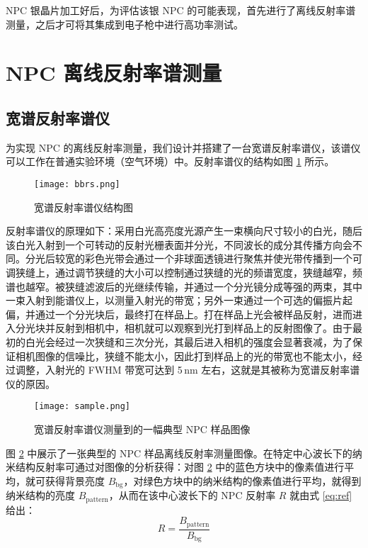 NPC 银晶片加工好后，为评估该银 NPC 的可能表现，首先进行了离线反射率谱测量，之后才可将其集成到电子枪中进行高功率测试。

\section{NPC 离线反射率谱测量}
\subsection{宽谱反射率谱仪}
为实现 NPC 的离线反射率测量，我们设计并搭建了一台宽谱反射率谱仪，该谱仪可以工作在普通实验环境（空气环境）中。反射率谱仪的结构如图 \ref{fig:bbrs} 所示。
\begin{figure}[htbp]
\centering
\texttt{[image: bbrs.png]}
\caption{\label{fig:bbrs} 宽谱反射率谱仪结构图}
\end{figure}

反射率谱仪的原理如下：采用白光高亮度光源产生一束横向尺寸较小的白光，随后该白光入射到一个可转动的反射光栅表面并分光，不同波长的成分其传播方向会不同。分光后较宽的彩色光带会通过一个非球面透镜进行聚焦并使光带传播到一个可调狭缝上，通过调节狭缝的大小可以控制通过狭缝的光的频谱宽度，狭缝越窄，频谱也越窄。被狭缝滤波后的光继续传输，并通过一个分光镜分成等强的两束，其中一束入射到能谱仪上，以测量入射光的带宽；另外一束通过一个可选的偏振片起偏，并通过一个分光块后，最终打在样品上。打在样品上光会被样品反射，进而进入分光块并反射到相机中，相机就可以观察到光打到样品上的反射图像了。由于最初的白光会经过一次狭缝和三次分光，其最后进入相机的强度会显著衰减，为了保证相机图像的信噪比，狭缝不能太小，因此打到样品上的光的带宽也不能太小，经过调整，入射光的 FWHM 带宽可达到 5\,nm 左右，这就是其被称为宽谱反射率谱仪的原因。

\begin{figure}[htbp]
\centering
\texttt{[image: sample.png]}
\caption{\label{fig:sample} 宽谱反射率谱仪测量到的一幅典型 NPC 样品图像}
\end{figure}

图 \ref{fig:sample} 中展示了一张典型的 NPC 样品离线反射率测量图像。在特定中心波长下的纳米结构反射率可通过对图像的分析获得：对图 \ref{fig:sample} 中的蓝色方块中的像素值进行平均，就可获得背景亮度 $B_{\text{bg}}$，对绿色方块中的纳米结构的像素值进行平均，就得到纳米结构的亮度 $B_{\text{pattern}}$，从而在该中心波长下的 NPC 反射率 $R$ 就由式 \ref{eq:ref} 给出：
\begin{equation}
\label{eq:ref}
R = \frac{B_{\text{pattern}}}{B_{\text{bg}}}
\end{equation}

